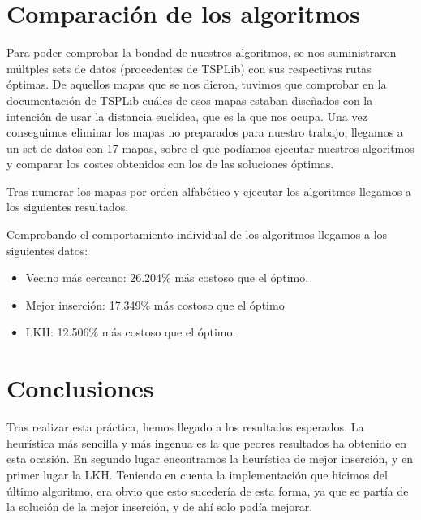 \documentclass[a4paper, 11pt]{article}
\begin{document}
\section{Comparación de los algoritmos}
Para poder comprobar la bondad de nuestros algoritmos, se nos suministraron múltples sets de datos (procedentes de TSPLib) con sus respectivas rutas óptimas. De aquellos mapas que se nos dieron, tuvimos que comprobar en la documentación de TSPLib cuáles de esos mapas estaban diseñados con la intención de usar la distancia euclídea, que es la que nos ocupa. Una vez conseguimos eliminar los mapas no preparados para nuestro trabajo, llegamos a un set de datos con 17 mapas, sobre el que podíamos ejecutar nuestros algoritmos y comparar los costes obtenidos con los de las soluciones óptimas.

Tras numerar los mapas por orden alfabético y ejecutar los algoritmos llegamos a los siguientes resultados.




Comprobando el comportamiento individual de los algoritmos llegamos a los siguientes datos:
\begin{itemize}
	\item Vecino más cercano: 26.204\% más costoso que el óptimo.
	\item Mejor inserción: 17.349\% más costoso que el óptimo
	\item LKH: 12.506\% más costoso que el óptimo.
\end{itemize}



\section{Conclusiones}
Tras realizar esta práctica, hemos llegado a los resultados esperados. La heurística más sencilla y más ingenua es la que peores resultados ha obtenido en esta ocasión. En segundo lugar encontramos la heurística de mejor inserción, y en primer lugar la LKH. Teniendo en cuenta la implementación que hicimos del último algoritmo, era obvio que esto sucedería de esta forma, ya que se partía de la solución de la mejor inserción, y de ahí solo podía mejorar.
\end{document}

